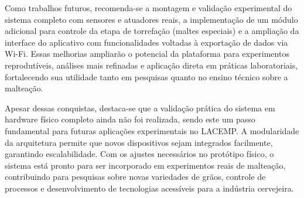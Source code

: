 Como trabalhos futuros, recomenda-se a montagem e validação experimental do sistema completo com sensores e atuadores reais, a implementação de um módulo adicional para controle da etapa de torrefação (maltes especiais) e a ampliação da interface do aplicativo com funcionalidades voltadas à exportação de dados via Wi-Fi. Essas melhorias ampliarão o potencial da plataforma para experimentos reprodutíveis, análises mais refinadas e aplicação direta em práticas laboratoriais, fortalecendo sua utilidade tanto em pesquisas quanto no ensino técnico sobre a malteação.

Apesar dessas conquistas, destaca-se que a validação prática do sistema em hardware físico completo ainda não foi realizada, sendo este um passo fundamental para futuras aplicações experimentais no LACEMP. A modularidade da arquitetura permite que novos dispositivos sejam integrados facilmente, garantindo escalabilidade. Com os ajustes necessários no protótipo físico, o sistema está pronto para ser incorporado em experimentos reais de malteação, contribuindo para pesquisas sobre novas variedades de grãos, controle de processos e desenvolvimento de tecnologias acessíveis para a indústria cervejeira.